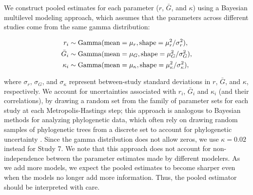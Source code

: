 \documentclass[12pt]{article}
\begin{document}
We construct pooled estimates for each parameter ($r$, $\bar G$, and $\kappa$) using a Bayesian multilevel modeling approach, which assumes that the parameters across different studies come from the same gamma distribution:
\begin{linenomath*}
\begin{equation}
\begin{aligned}
r_i &\sim \mathrm{Gamma}(\mathrm{mean}=\mu_r, \mathrm{shape}=\mu_r^2/\sigma_r^2),\\
\bar{G}_i &\sim \mathrm{Gamma}(\mathrm{mean}=\mu_G, \mathrm{shape}=\mu_G^2/\sigma_G^2),\\
\kappa_i &\sim \mathrm{Gamma}(\mathrm{mean}=\mu_\kappa, \mathrm{shape}=\mu_\kappa^2/\sigma_\kappa^2),\\
\end{aligned}
\end{equation}
\end{linenomath*}
where $\sigma_r$, $\sigma_G$, and $\sigma_\kappa$ represent between-study standard deviations in $r$, $\bar G$, and $\kappa$, respectively.
We account for uncertainties associated with $r_i$, $\bar G_i$ and $\kappa_i$ (and their correlations), by drawing a random set from the family of parameter sets for each study at each Metropolis-Hastings step;
this approach is analogous to Bayesian methods for analyzing phylogenetic data, which often rely on drawing random samples of phylogenetic trees from a discrete set to account for phylogenetic uncertainty \citep{pagel2004bayesian,bedford2014integrating}.
Since the gamma distribution does not allow zeros, we use $\kappa=0.02$ instead for Study 7.
We note that this approach does not account for non-independence between the parameter estimates made by different modelers.
As we add more models, we expect the pooled estimates to become sharper even when the models no longer add more information.
Thus, the pooled estimator should be interpreted with care.
\end{document}
